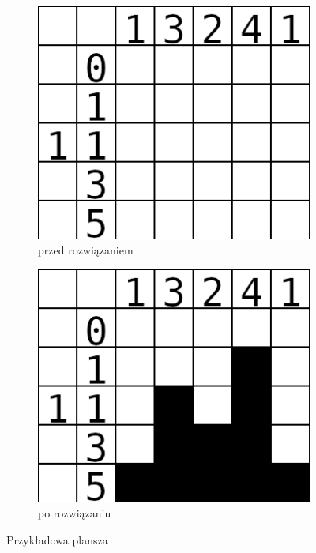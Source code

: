 \begin{figure}[!htb]
    \centering
    \begin{subfigure}[b]{0.3\textwidth}
        \centering
        \includegraphics[width=\textwidth]{images/nonogram_example_empty.png}
        \caption{przed rozwiązaniem}
    \end{subfigure}
    \begin{subfigure}[b]{0.3\textwidth}
        \centering
        \includegraphics[width=\textwidth]{images/nonogram_example_filled.png}
        \caption{po rozwiązaniu}
    \end{subfigure}
    \caption{Przykładowa plansza}
\end{figure}

